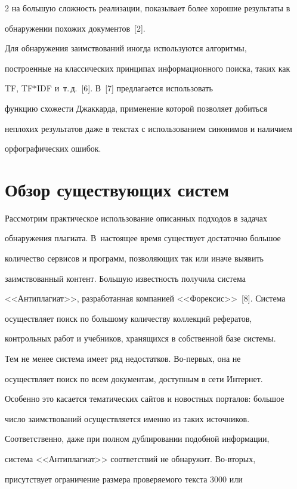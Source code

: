 \begin{multicols}{2}
на большую сложность реализации, показывает более хорошие результаты в 

обнаружении похожих документов~[2].

  

  Для обнаружения заимствований иногда используются алгоритмы, 

построенные на классических принципах информационного поиска, таких как 

{TF}, {TF*IDF} и~т.\,д.~[6]. В~[7] предлагается использовать 

функцию схожести Джаккарда, применение которой позволяет добиться 

неплохих результатов даже в текстах с использованием синонимов и наличием 

орфографических ошибок.



\section{Обзор существующих систем}



  Рассмотрим практическое использование описанных подходов в задачах 

обнаружения плагиата. В~настоящее время существует достаточно большое 

количество сервисов и программ, позволяющих так или иначе выявить 

заимствованный контент. Большую известность получила сис\-те\-ма 

<<Антиплагиат>>, разработанная компанией <<Форексис>>~[8]. Сис\-те\-ма 

осуществляет поиск по большому количеству коллекций рефератов, 

контрольных работ и учебников, хранящихся в собственной базе сис\-те\-мы. 

Тем не менее сис\-те\-ма имеет ряд недостатков. Во-пер\-вых, она не 

осуществляет поиск по всем документам, доступным в сети Интернет. 

Особенно это касается тематических сайтов и новостных порталов: большое 

число заимствований осуществляется именно из таких источников. 

Соответственно, даже при полном дублировании подобной информации, 

  сис\-те\-ма <<Антиплагиат>> соответствий не обнаружит. Во-вто\-рых, 

присутствует ограничение размера проверяемого текста 3000 или 


\end{multicols}
